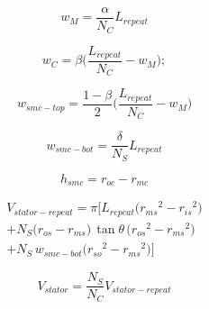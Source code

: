                 
                \begin{equation}
                    w_M = \frac{\alpha}{N_C} L_{repeat}
                    \label{eq:rsm/LFSM/w_m}
                \end{equation}
                
                
                \begin{equation}
                    w_C = \beta\bigg(\frac{L_{repeat}}{N_C}-w_M\bigg);
                    \label{eq:rsm/LFSM/w_c}
                \end{equation}
                
                
                \begin{equation}
                    w_{smc-top} = \frac{1-\beta}{2}\bigg(\frac{L_{repeat}}{N_C}-w_M\bigg)
                    \label{eq:rsm/LFSM/w_smc_top}
                \end{equation}
                
                
                \begin{equation}
                    w_{smc-bot} =  \frac{\delta }{N_S}L_{repeat}
                    \label{eq:rsm/LFSM/w_smc_bot}
                \end{equation}
                
                
                \begin{equation}
                    h_{smc} = r_{oc} - r_{mc}
                    \label{eq:rsm/LFSM/h_smc}
                \end{equation}
                
                
                \begin{equation}
                    \begin{array}{c}
                        V_{stator-repeat} = \pi \bigg[  L_{repeat}  \big({r_{ms}}^2-{r_{is}}^2\big)\\
                        + N_S  \big(r_{os}-r_{ms}\big)\,\tan{\theta}\,\big({r_{os}}^2-{r_{ms}}^2\big)\\
                        + N_S\,w_{smc-bot}\big( {r_{so}}^2 - {r_{ms}}^2 \big)\bigg]
                    \end{array}
                    \label{eq:rsm/LFSM/V_stator_repeat}
                \end{equation}
                
                
                \begin{equation}
                    V_{stator} = \frac{N_S}{N_C}V_{stator-repeat}
                    \label{eq:rsm/LFSM/V_stator}
                \end{equation}
                
